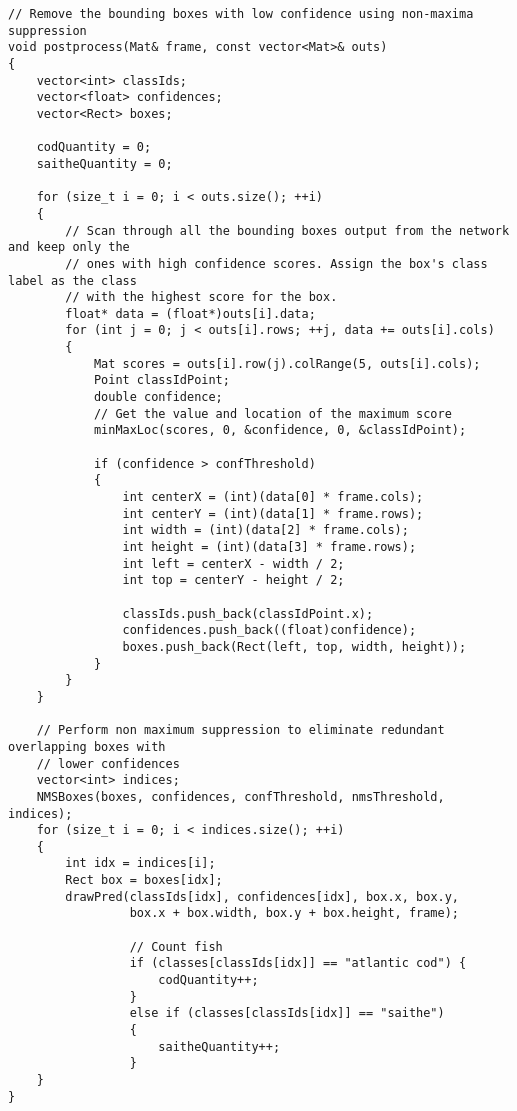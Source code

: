 \label{lst:postprocess}
\begin{verbatim}
// Remove the bounding boxes with low confidence using non-maxima suppression
void postprocess(Mat& frame, const vector<Mat>& outs)
{
    vector<int> classIds;
    vector<float> confidences;
    vector<Rect> boxes;

    codQuantity = 0;
    saitheQuantity = 0;

    for (size_t i = 0; i < outs.size(); ++i)
    {
        // Scan through all the bounding boxes output from the network and keep only the
        // ones with high confidence scores. Assign the box's class label as the class
        // with the highest score for the box.
        float* data = (float*)outs[i].data;
        for (int j = 0; j < outs[i].rows; ++j, data += outs[i].cols)
        {
            Mat scores = outs[i].row(j).colRange(5, outs[i].cols);
            Point classIdPoint;
            double confidence;
            // Get the value and location of the maximum score
            minMaxLoc(scores, 0, &confidence, 0, &classIdPoint);

            if (confidence > confThreshold)
            {
                int centerX = (int)(data[0] * frame.cols);
                int centerY = (int)(data[1] * frame.rows);
                int width = (int)(data[2] * frame.cols);
                int height = (int)(data[3] * frame.rows);
                int left = centerX - width / 2;
                int top = centerY - height / 2;

                classIds.push_back(classIdPoint.x);
                confidences.push_back((float)confidence);
                boxes.push_back(Rect(left, top, width, height));
            }
        }
    }

    // Perform non maximum suppression to eliminate redundant overlapping boxes with
    // lower confidences
    vector<int> indices;
    NMSBoxes(boxes, confidences, confThreshold, nmsThreshold, indices);
    for (size_t i = 0; i < indices.size(); ++i)
    {
        int idx = indices[i];
        Rect box = boxes[idx];
        drawPred(classIds[idx], confidences[idx], box.x, box.y,
                 box.x + box.width, box.y + box.height, frame);
                 
                 // Count fish
                 if (classes[classIds[idx]] == "atlantic cod") {
                     codQuantity++;
                 }
                 else if (classes[classIds[idx]] == "saithe")
                 {
                     saitheQuantity++;
                 }
    }
}
\end{verbatim}

